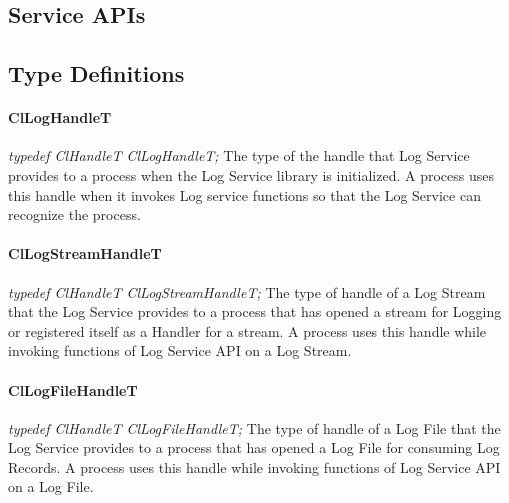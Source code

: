 \begin{flushleft}
\chapter{Service APIs}

\section{Type Definitions}

\subsubsection{ClLogHandleT}
\textit{typedef ClHandleT ClLogHandleT;}
\newline
\newline
The type of the handle that Log Service provides to a process when the Log Service library is initialized. 
A process uses this handle when it invokes Log service functions so that the Log Service can recognize the process.


\subsubsection{ClLogStreamHandleT}
\textit{typedef ClHandleT ClLogStreamHandleT;}
\newline
\newline
The type of handle of a Log Stream that the Log Service provides to a process that has opened a stream for Logging or registered itself as a Handler for
a stream. A process uses this handle while invoking functions of Log Service API on a Log Stream.


\subsubsection{ClLogFileHandleT}
\textit{typedef ClHandleT ClLogFileHandleT;}
\newline
\newline
The type of handle of a Log File that the Log Service provides to a process that has opened a Log File for consuming Log Records.
A process uses this handle while invoking functions of Log Service API on a Log File.




\end{flushleft}
